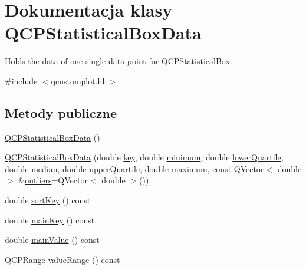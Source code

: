 \hypertarget{class_q_c_p_statistical_box_data}{}\section{Dokumentacja klasy Q\+C\+P\+Statistical\+Box\+Data}
\label{class_q_c_p_statistical_box_data}


Holds the data of one single data point for \hyperlink{class_q_c_p_statistical_box}{Q\+C\+P\+Statistical\+Box}.  




{\ttfamily \#include $<$qcustomplot.\+hh$>$}

\subsection*{Metody publiczne}
\begin{DoxyCompactItemize}
\item 
\hyperlink{class_q_c_p_statistical_box_data_ab96c4b93670a8dcac8a3d4080fd722ee}{Q\+C\+P\+Statistical\+Box\+Data} ()
\item 
\hyperlink{class_q_c_p_statistical_box_data_a66b0c6d39765d0feb49c286fba4e4ef5}{Q\+C\+P\+Statistical\+Box\+Data} (double \hyperlink{class_q_c_p_statistical_box_data_a2d0b5ca5130e8a73294c46b8b2fd77b8}{key}, double \hyperlink{class_q_c_p_statistical_box_data_adc2f4b8cbff9f2e4a676f32bad8a7e3a}{minimum}, double \hyperlink{class_q_c_p_statistical_box_data_af9f478b4ea0789fa6cff7eebb654b5d4}{lower\+Quartile}, double \hyperlink{class_q_c_p_statistical_box_data_a116cd53ae6685979ec3b051cfc7dbba5}{median}, double \hyperlink{class_q_c_p_statistical_box_data_a5604dfe04b103e5ac73ce7895b46303b}{upper\+Quartile}, double \hyperlink{class_q_c_p_statistical_box_data_aa2800abda337decfc4277cb8bf846d6f}{maximum}, const Q\+Vector$<$ double $>$ \&\hyperlink{class_q_c_p_statistical_box_data_abaa27539fbd941d3f1eb8169e881e308}{outliers}=Q\+Vector$<$ double $>$())
\item 
double \hyperlink{class_q_c_p_statistical_box_data_ad00ab8d43ec89a40ec7ee7ca154a2b0e}{sort\+Key} () const 
\item 
double \hyperlink{class_q_c_p_statistical_box_data_ae0f68c5e61909838e7e85618a6c72019}{main\+Key} () const 
\item 
double \hyperlink{class_q_c_p_statistical_box_data_a1c90d779c2ddf6d96da5384fd8121645}{main\+Value} () const 
\item 
\hyperlink{class_q_c_p_range}{Q\+C\+P\+Range} \hyperlink{class_q_c_p_statistical_box_data_abe311ba7ba785215f791db23498f702f}{value\+Range} () const 
\end{DoxyCompactItemize}
